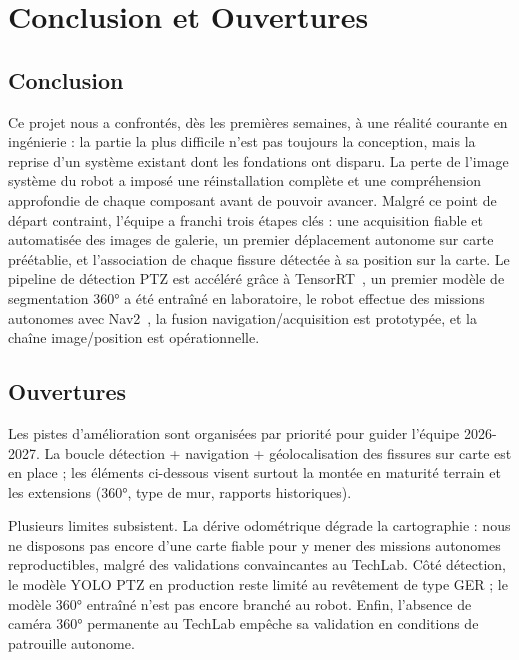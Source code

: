 \documentclass[12pt,a4paper]{article}
\begin{document}
\section{Conclusion et Ouvertures}

\subsection{Conclusion}

Ce projet nous a confrontés, dès les premières semaines, à une réalité courante en ingénierie : la partie la plus difficile n'est pas toujours la conception, mais la reprise d'un système existant dont les fondations ont disparu. La perte de l'image système du robot a imposé une réinstallation complète et une compréhension approfondie de chaque composant avant de pouvoir avancer. Malgré ce point de départ contraint, l'équipe a franchi trois étapes clés : une acquisition fiable et automatisée des images de galerie, un premier déplacement autonome sur carte préétablie, et l'association de chaque fissure détectée à sa position sur la carte. Le pipeline de détection PTZ est accéléré grâce à TensorRT~\cite{tensorrt}, un premier modèle de segmentation 360° a été entraîné en laboratoire, le robot effectue des missions autonomes avec Nav2~\cite{nav2}, la fusion navigation/acquisition est prototypée, et la chaîne image/position est opérationnelle.

\subsection{Ouvertures}

Les pistes d'amélioration sont organisées par priorité pour guider l'équipe 2026-2027. La boucle détection + navigation + géolocalisation des fissures sur carte est en place ; les éléments ci-dessous visent surtout la montée en maturité terrain et les extensions (360°, type de mur, rapports historiques).

Plusieurs limites subsistent. La dérive odométrique dégrade la cartographie : nous ne disposons pas encore d'une carte fiable pour y mener des missions autonomes reproductibles, malgré des validations convaincantes au TechLab. Côté détection, le modèle YOLO PTZ en production reste limité au revêtement de type GER ; le modèle 360° entraîné n'est pas encore branché au robot. Enfin, l'absence de caméra 360° permanente au TechLab empêche sa validation en conditions de patrouille autonome.
\end{document}
